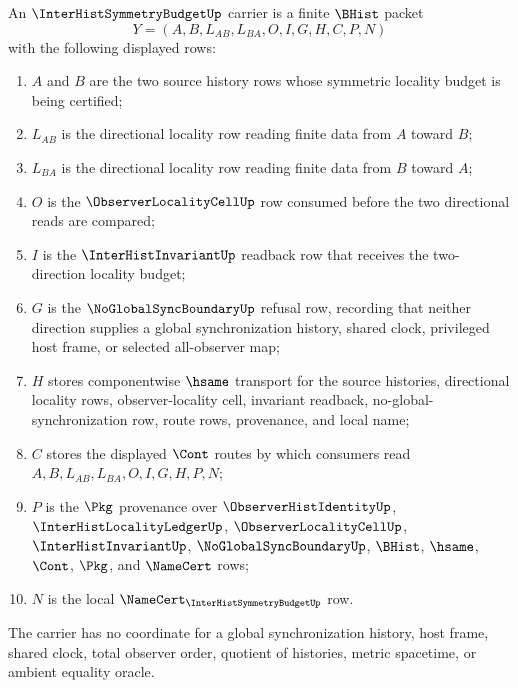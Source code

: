 \begin{definition}
\label{def:inter-hist-symmetry-budget-carrier}
An $\InterHistSymmetryBudgetUp$ carrier is a finite $\BHist$ packet
$$
Y=(A,B,L_{AB},L_{BA},O,I,G,H,C,P,N)
$$
with the following displayed rows:
\begin{enumerate}
\item $A$ and $B$ are the two source history rows whose symmetric locality budget is being certified;
\item $L_{AB}$ is the directional locality row reading finite data from $A$ toward $B$;
\item $L_{BA}$ is the directional locality row reading finite data from $B$ toward $A$;
\item $O$ is the $\ObserverLocalityCellUp$ row consumed before the two directional reads are compared;
\item $I$ is the $\InterHistInvariantUp$ readback row that receives the two-direction locality budget;
\item $G$ is the $\NoGlobalSyncBoundaryUp$ refusal row, recording that neither direction supplies a global synchronization history, shared clock, privileged host frame, or selected all-observer map;
\item $H$ stores componentwise $\hsame$ transport for the source histories, directional locality rows, observer-locality cell, invariant readback, no-global-synchronization row, route rows, provenance, and local name;
\item $C$ stores the displayed $\Cont$ routes by which consumers read $A,B,L_{AB},L_{BA},O,I,G,H,P,N$;
\item $P$ is the $\Pkg$ provenance over $\ObserverHistIdentityUp$, $\InterHistLocalityLedgerUp$, $\ObserverLocalityCellUp$, $\InterHistInvariantUp$, $\NoGlobalSyncBoundaryUp$, $\BHist$, $\hsame$, $\Cont$, $\Pkg$, and $\NameCert$ rows;
\item $N$ is the local $\NameCert_{\InterHistSymmetryBudgetUp}$ row.
\end{enumerate}
The carrier has no coordinate for a global synchronization history, host frame, shared clock, total observer order, quotient of histories, metric spacetime, or ambient equality oracle.
\end{definition}

